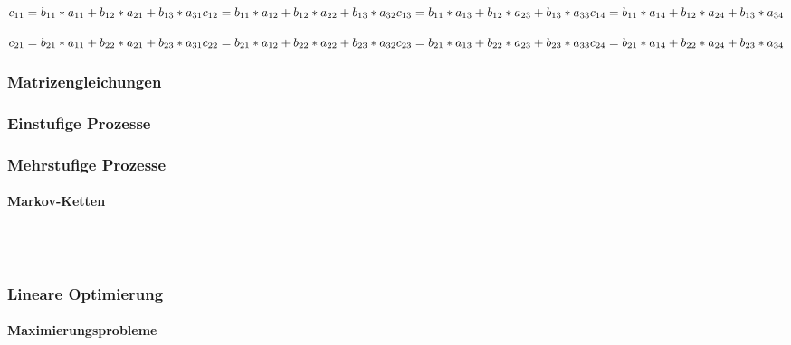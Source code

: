 \documentclass[a4paper]{article} %
\begin{document}
		$\\
		c_{11}=b_{11}*a_{11}+b_{12}*a_{21}+b_{13}*a_{31}\\\\
		c_{12}=b_{11}*a_{12}+b_{12}*a_{22}+b_{13}*a_{32}\\\\
		c_{13}=b_{11}*a_{13}+b_{12}*a_{23}+b_{13}*a_{33}\\\\
		c_{14}=b_{11}*a_{14}+b_{12}*a_{24}+b_{13}*a_{34} 
		$

		$
		\\
		c_{21}=b_{21}*a_{11}+b_{22}*a_{21}+b_{23}*a_{31}\\\\
		c_{22}=b_{21}*a_{12}+b_{22}*a_{22}+b_{23}*a_{32}\\\\
		c_{23}=b_{21}*a_{13}+b_{22}*a_{23}+b_{23}*a_{33}\\\\
		c_{24}=b_{21}*a_{14}+b_{22}*a_{24}+b_{23}*a_{34}
		$



	
	\subsubsection{Matrizengleichungen}
	

	\subsubsection{Einstufige Prozesse}
	\subsubsection{Mehrstufige Prozesse}
	\paragraph{Markov-Ketten}
	\hspace{0 cm} \\ \noindent \\
	\subsubsection{Lineare Optimierung}
	\paragraph{Maximierungsprobleme}
	 \hspace{0 cm} \\ \noindent \\
\end{document}

